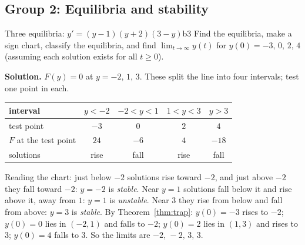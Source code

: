 \documentclass[11pt]{article}
\begin{document}
\subsection*{Group 2: Equilibria and stability}

\begin{exmp}{Three equilibria: $y'=(y-1)(y+2)(3-y)$}{b3}
Find the equilibria, make a sign chart, classify the equilibria, and find $\lim_{t\to\infty}y(t)$ for $y(0)=-3,\,0,\,2,\,4$ (assuming each solution exists for all $t\ge0$).

\textbf{Solution.} $F(y)=0$ at $y=-2,\,1,\,3$. These split the line into four intervals; test one point in each.
\begin{center}
\begin{tabular}{lcccc}
\toprule interval & $y<-2$ & $-2<y<1$ & $1<y<3$ & $y>3$\\\midrule
test point & $-3$ & $0$ & $2$ & $4$\\
$F$ at the test point & $24$ & $-6$ & $4$ & $-18$\\
solutions & rise & fall & rise & fall\\\bottomrule
\end{tabular}
\end{center}
Reading the chart: just below $-2$ solutions rise toward $-2$, and just above $-2$ they fall toward $-2$: $y=-2$ is \emph{stable}. Near $y=1$ solutions fall below it and rise above it, away from $1$: $y=1$ is \emph{unstable}. Near $3$ they rise from below and fall from above: $y=3$ is \emph{stable}. By Theorem~\ref{thm:trap}: $y(0)=-3$ rises to $-2$; $y(0)=0$ lies in $(-2,1)$ and falls to $-2$; $y(0)=2$ lies in $(1,3)$ and rises to $3$; $y(0)=4$ falls to $3$. So the limits are $-2,\,-2,\,3,\,3$.
\end{exmp}
\end{document}
